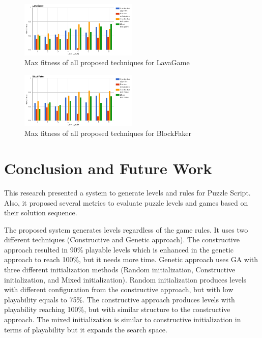 \documentclass[letterpaper]{article}
\begin{document}
\begin{figure}
  	\centering
    \includegraphics[width=0.5\textwidth]{Images/lavaGameComparison}
    \caption{Max fitness of all proposed techniques for LavaGame}
    \label{Figure:lavaGameComparisonmparison}
\end{figure}

\begin{figure}
  	\centering
    \includegraphics[width=0.5\textwidth]{Images/blockFakerComparison}
    \caption{Max fitness of all proposed techniques for BlockFaker}
    \label{Figure:blockFakerComparison}
\end{figure}

\section{Conclusion and Future Work}
This research presented a system to generate levels and rules for Puzzle Script. Also, it proposed several metrics to evaluate puzzle levels and games based on their solution sequence.\\\par

The proposed system generates levels regardless of the game rules. It uses two different techniques (Constructive and Genetic approach). The constructive approach resulted in 90\% playable levels which is enhanced in the genetic approach to reach 100\%, but it needs more time. Genetic approach uses GA with three different initialization methods (Random initialization, Constructive initialization, and Mixed initialization). Random initialization produces levels with different configuration from the constructive approach, but with low playability equals to 75\%.  The constructive approach produces levels with playability reaching 100\%, but with similar structure to the constructive approach. The mixed initialization is similar to constructive initialization in terms of playability but it expands the search space.\\\par
\end{document}
